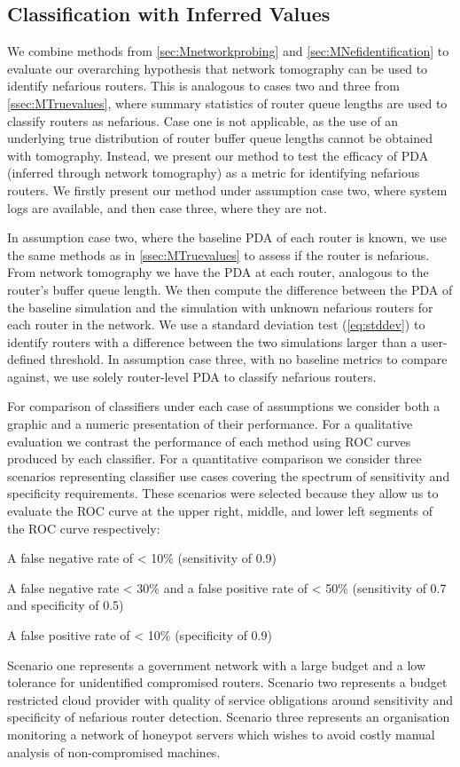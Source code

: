 \subsection{Classification with Inferred Values}
\label{ssec:MInferredvalues}
We combine methods from \cref{sec:Mnetworkprobing} and \cref{sec:MNefidentification} to evaluate our overarching hypothesis that network tomography can be used to identify nefarious routers. This is analogous to cases two and three from \cref{ssec:MTruevalues}, where summary statistics of router queue lengths are used to classify routers as nefarious. Case one is not applicable, as the use of an underlying true distribution of router buffer queue lengths cannot be obtained with tomography. Instead, we present our method to test the efficacy of PDA (inferred through network tomography) as a metric for identifying nefarious routers. We firstly present our method under assumption case two, where system logs are available, and then case three, where they are not.\par
In assumption case two, where the baseline PDA of each router is known, we use the same methods as in \cref{ssec:MTruevalues} to assess if the router is nefarious. From network tomography we have the PDA at each router, analogous to the router's buffer queue length. We then compute the difference between the PDA of the baseline simulation and the simulation with unknown nefarious routers for each router in the network. We use a standard deviation test (\cref{eq:stddev}) to identify routers with a difference between the two simulations larger than a user-defined threshold. In assumption case three, with no baseline metrics to compare against, we use solely router-level PDA to classify nefarious routers.\par
For comparison of classifiers under each case of assumptions we consider both a graphic and a numeric presentation of their performance. For a qualitative evaluation we contrast the performance of each method using ROC curves produced by each classifier. For a quantitative comparison we consider three scenarios representing classifier use cases covering the spectrum of sensitivity and specificity requirements. These scenarios were selected because they allow us to evaluate the ROC curve at the upper right, middle, and lower left segments of the ROC curve respectively: 
\begin{description}[labelindent=1cm]
  \item[Scenario 1:] A false negative rate of < 10\% (sensitivity of 0.9)
  \item[Scenario 2:] A false negative rate < 30\%  and a false positive rate of < 50\% (sensitivity of 0.7 and specificity of 0.5)
  \item[Scenario 3:] A false positive rate of < 10\% (specificity of 0.9)
\end{description}
Scenario one represents a government network with a large budget and a low tolerance for unidentified compromised routers. Scenario two represents a budget restricted cloud provider with quality of service obligations around sensitivity and specificity of nefarious router detection. Scenario three represents an organisation monitoring a network of honeypot servers which wishes to avoid costly manual analysis of non-compromised machines.

